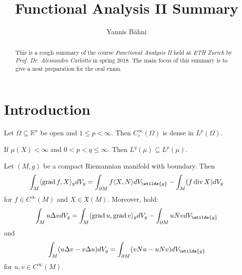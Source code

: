 

\setcounter{section}{1}

\title{Functional Analysis II Summary}
\author{Yannis B\"{a}hni}
\address[Yannis B\"{a}hni]{University of Zurich, R\"{a}mistrasse 71, 8006 Zurich}



\begin{abstract}
	This is a rough summary of the course \emph{Functional Analysis II} held at \emph{ETH Zurich} by \emph{Prof. Dr. Alessandro Carlotto} in spring $2018$. The main focus of this summary is to give a neat preparation for the oral exam.
\end{abstract}

\maketitle

\tableofcontents

\section*{Introduction}

\begin{theorem}
	Let $\Omega \subseteq \mathbb{R}^n$ be open and $1 \leq p < \infty$. Then $C^\infty_c(\Omega)$ is dense in $L^p(\Omega)$.
\end{theorem}

\begin{proposition}
	If $\mu(X) < \infty$ and $0 < p < q \leq \infty$. Then $L^q(\mu) \subseteq L^p(\mu)$.
\end{proposition}

\begin{proposition}
	Let $(M,g)$ be a compact Riemannian manifold with boundary. Then
	\begin{equation*}
		\int_M \langle \grad f,X \rangle_g dV_g = \int_{\partial M}f \langle X,N \rangle dV_{\wtilde{g}} - \int_M (f \div X) dV_g
	\end{equation*}
	\noindent for $f \in C^\infty(M)$ and $X \in \mathfrak{X}(M)$. Moreover,  hold:
	\begin{equation*}
		\int_M u\Delta v dV_g = \int_M \langle \grad u,\grad v\rangle_g dV_g - \int_{\partial M} uNv dV_{\wtilde{g}}
	\end{equation*}
	\noindent and
	\begin{equation*}
		\int_M (u\Delta v - v \Delta u)dV_g = \int_{\partial M}(vNu - u Nv)dV_{\wtilde{g}}
	\end{equation*}
	\noindent for $u,v \in C^\infty(M)$.
\end{proposition}

